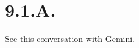 \section{9.1.A.}

See this \href{https://gemini.google.com/share/7468570c8289}{conversation} with Gemini.